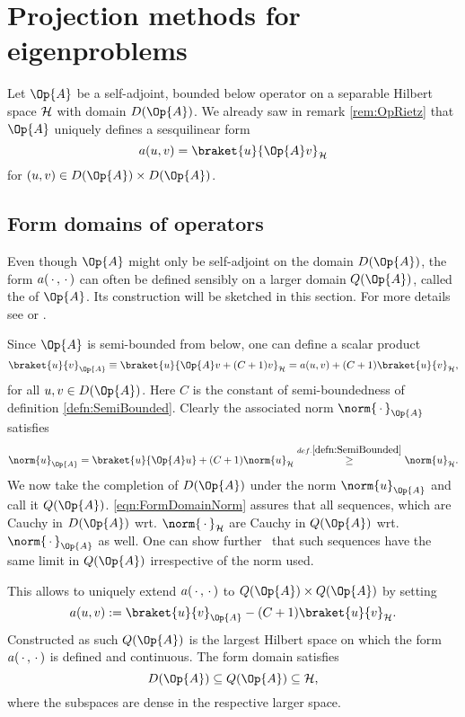 \section{Projection methods for eigenproblems}
\label{sec:Projection}

Let $\Op{A}$ be a self-adjoint, bounded below operator on a separable Hilbert space
$\mathcal{H}$ with domain $D(\Op{A})$.
We already saw in remark \vref{rem:OpRietz}
that $\Op{A}$ uniquely defines a sesquilinear form
\[ a(u, v) = \braket{u}{\Op{A} v}_\hilbert \]
for $(u, v) \in D(\Op{A}) \times D(\Op{A})$.

\subsection{Form domains of operators}
Even though $\Op{A}$ might only be self-adjoint on the domain $D(\Op{A})$,
the form $a(\,\cdot\,, \,\cdot\,)$ can often be defined sensibly
on a larger domain $Q(\Op{A})$, called the  of $\Op{A}$.
Its construction will be sketched in this section.
For more details see \cite[p. 77]{Teschl2014} or \cite[p. 276]{Reed1980}.

\noindent
Since $\Op{A}$ is semi-bounded from below, one can define a scalar product
\[
	\braket{u}{v}_{\Op{A}} \equiv \braket{u}{\Op{A} v + (C + 1) v}_{\hilbert}
	= a(u, v) + (C+1) \braket{u}{v}_{\hilbert},
\]
for all $u,v \in D(\Op{A})$.
Here $C$ is the constant of semi-boundedness of definition \vref{defn:SemiBounded}.
Clearly the associated norm $\norm{\slot}_{\Op{A}}$ satisfies
\begin{equation}
	\label{eqn:FormDomainNorm}
\norm{u}_{\Op{A}}
= \braket{u}{\Op{A} u} + (C+1) \norm{u}_{\hilbert}
\stackrel{def. \ref{defn:SemiBounded}}{\geq} \norm{u}_{\hilbert}.
\end{equation}
We now take the completion of $D(\Op{A})$ under the norm $\norm{u}_{\Op{A}}$
and call it $Q(\Op{A})$.
\eqref{eqn:FormDomainNorm} assures that all sequences,
which are Cauchy in $D(\Op{A})$ wrt. $\norm{\slot}_{\hilbert}$
are Cauchy in $Q(\Op{A})$ wrt. $\norm{\slot}_{\Op{A}}$ as well.
One can show further~\cite{Teschl2014} that such sequences
have the same limit in $Q(\Op{A})$ irrespective of the norm used.

\noindent
This allows to uniquely
extend $a(\,\cdot\,, \,\cdot\,)$ to $Q(\Op{A}) \times Q(\Op{A})$ by setting
\[ a(u, v) := \braket{u}{v}_{\Op{A}} - (C+1) \braket{u}{v}_{\hilbert}. \]
Constructed as such $Q(\Op{A})$ is the largest Hilbert space on which the form
$a(\,\cdot\,, \,\cdot\,)$ is defined and continuous.
The form domain satisfies
\[ D(\Op{A}) \subseteq Q(\Op{A}) \subseteq \hilbert, \]
where the subspaces are dense in the respective larger space.


